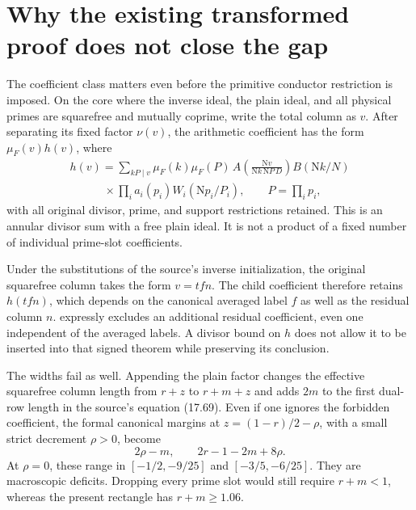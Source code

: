 \documentclass[11pt]{article}
\theoremstyle{definition}
\theoremstyle{remark}
\numberwithin{equation}{section}
\newcommand{\Nm}{\mathrm N}
\begin{document}
\section{Why the existing transformed proof does not close the gap}
\label{sec:obstruction}

The coefficient class matters even before the primitive conductor
restriction is imposed. On the core where the inverse ideal, the
plain ideal, and all physical primes are squarefree and mutually
coprime, write the total column as $v$. After separating its fixed
factor $\nu(v)$, the arithmetic coefficient has the form
$\mu_F(v)h(v)$, where
\begin{equation}\label{eq:h}
\begin{split}
h(v)=\sum_{kP\mid v}\mu_F(k)\mu_F(P)\,
A\!\left(\frac{\Nm v}{\Nm k\,\Nm P\,D}\right)B(\Nm k/N)\\
\hspace{3em}{}\times\prod_i a_i(p_i)W_i(\Nm p_i/P_i),
\qquad P=\prod_i p_i,
\end{split}
\end{equation}
with all original divisor, prime, and support restrictions retained.
This is an annular divisor sum with a free plain ideal. It is not
a product of a fixed number of individual prime-slot coefficients.

Under the substitutions of the source's inverse initialization,
the original squarefree column takes the form $v=tfn$.
The child coefficient therefore retains $h(tfn)$, which depends on
the canonical averaged label $f$ as well as the residual column $n$.
\cite[Lemma 17.2]{openai} expressly excludes an additional residual
coefficient, even one independent of the averaged labels.
A divisor bound on $h$ does not allow it to be inserted into that
signed theorem while preserving its conclusion.

The widths fail as well. Appending the plain factor changes the
effective squarefree column length from $r+z$ to $r+m+z$ and adds
$2m$ to the first dual-row length in the source's equation (17.69).
Even if one ignores the forbidden coefficient, the formal canonical
margins at $z=(1-r)/2-\rho$, with a small strict decrement $\rho>0$,
become
\begin{equation}\label{eq:bad-widths}
2\rho-m,\qquad 2r-1-2m+8\rho.
\end{equation}
At $\rho=0$, these range in $[-1/2,-9/25]$ and
$[-3/5,-6/25]$. They are macroscopic deficits. Dropping every
prime slot would still require $r+m<1$, whereas the present rectangle
has $r+m\ge1.06$.
\end{document}
